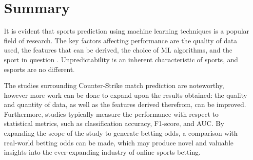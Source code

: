\section{Summary}

It is evident that sports prediction using machine learning techniques is a popular field of research. The key factors affecting performance are the quality of data used, the features that can be derived, the choice of ML algorithms, and the sport in question \cite{mlsports}. Unpredictability is an inherent characteristic of sports, and esports are no different.

The studies surrounding Counter-Strike match prediction are noteworthy, however more work can be done to expand upon the results obtained: the quality and quantity of data, as well as the features derived therefrom, can be improved. Furthermore, studies typically measure the performance with respect to statistical metrics, such as classification accuracy, F1-score, and AUC. By expanding the scope of the study to generate betting odds, a comparison with real-world betting odds can be made, which may produce novel and valuable insights into the ever-expanding industry of online sports betting.